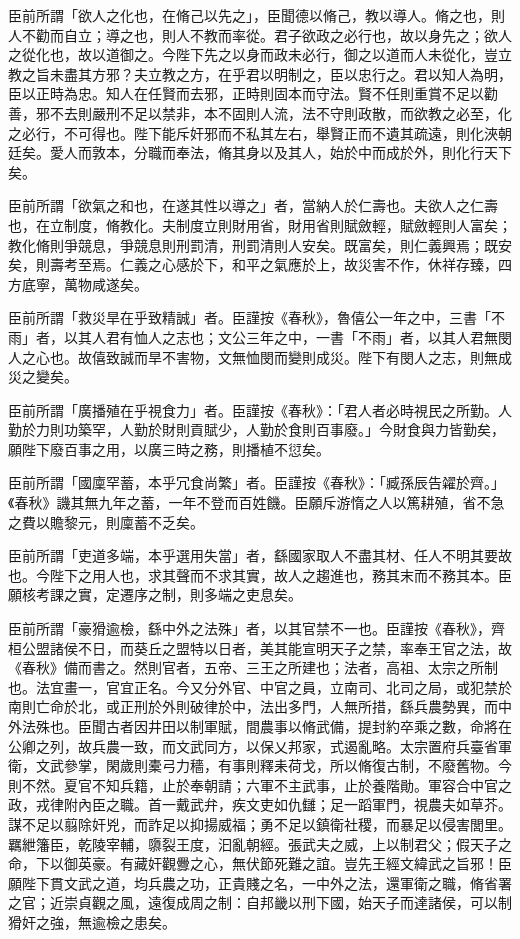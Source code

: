 \begin{pinyinscope}
 臣前所謂「欲人之化也，在脩己以先之」，臣聞德以脩己，教以導人。脩之也，則人不勸而自立；導之也，則人不教而率從。君子欲政之必行也，故以身先之；欲人之從化也，故以道御之。今陛下先之以身而政未必行，御之以道而人未從化，豈立教之旨未盡其方邪？夫立教之方，在乎君以明制之，臣以忠行之。君以知人為明，臣以正時為忠。知人在任賢而去邪，正時則固本而守法。賢不任則重賞不足以勸善，邪不去則嚴刑不足以禁非，本不固則人流，法不守則政散，而欲教之必至，化之必行，不可得也。陛下能斥奸邪而不私其左右，舉賢正而不遺其疏遠，則化浹朝廷矣。愛人而敦本，分職而奉法，脩其身以及其人，始於中而成於外，則化行天下矣。



 臣前所謂「欲氣之和也，在遂其性以導之」者，當納人於仁壽也。夫欲人之仁壽也，在立制度，脩教化。夫制度立則財用省，財用省則賦斂輕，賦斂輕則人富矣；教化脩則爭競息，爭競息則刑罰清，刑罰清則人安矣。既富矣，則仁義興焉；既安矣，則壽考至焉。仁義之心感於下，和平之氣應於上，故災害不作，休祥存臻，四方底寧，萬物咸遂矣。



 臣前所謂「救災旱在乎致精誠」者。臣謹按《春秋》，魯僖公一年之中，三書「不雨」者，以其人君有恤人之志也；文公三年之中，一書「不雨」者，以其人君無閔人之心也。故僖致誠而旱不害物，文無恤閔而變則成災。陛下有閔人之志，則無成災之變矣。



 臣前所謂「廣播殖在乎視食力」者。臣謹按《春秋》：「君人者必時視民之所勤。人勤於力則功築罕，人勤於財則貢賦少，人勤於食則百事廢。」今財食與力皆勤矣，願陛下廢百事之用，以廣三時之務，則播植不愆矣。



 臣前所謂「國廩罕蓄，本乎冗食尚繁」者。臣謹按《春秋》：「臧孫辰告糴於齊。」《春秋》譏其無九年之蓄，一年不登而百姓饑。臣願斥游惰之人以篤耕殖，省不急之費以贍黎元，則廩蓄不乏矣。



 臣前所謂「吏道多端，本乎選用失當」者，繇國家取人不盡其材、任人不明其要故也。今陛下之用人也，求其聲而不求其實，故人之趨進也，務其末而不務其本。臣願核考課之實，定遷序之制，則多端之吏息矣。



 臣前所謂「豪猾逾檢，繇中外之法殊」者，以其官禁不一也。臣謹按《春秋》，齊桓公盟諸侯不日，而葵丘之盟特以日者，美其能宣明天子之禁，率奉王官之法，故《春秋》備而書之。然則官者，五帝、三王之所建也；法者，高祖、太宗之所制也。法宜畫一，官宜正名。今又分外官、中官之員，立南司、北司之局，或犯禁於南則亡命於北，或正刑於外則破律於中，法出多門，人無所措，繇兵農勢異，而中外法殊也。臣聞古者因井田以制軍賦，間農事以脩武備，提封約卒乘之數，命將在公卿之列，故兵農一致，而文武同方，以保乂邦家，式遏亂略。太宗置府兵臺省軍衛，文武參掌，閑歲則橐弓力穡，有事則釋耒荷戈，所以脩復古制，不廢舊物。今則不然。夏官不知兵籍，止於奉朝請；六軍不主武事，止於養階勛。軍容合中官之政，戎律附內臣之職。首一戴武弁，疾文吏如仇讎；足一蹈軍門，視農夫如草芥。謀不足以翦除奸兇，而詐足以抑揚威福；勇不足以鎮衛社稷，而暴足以侵害閭里。羈紲籓臣，乾陵宰輔，隳裂王度，汩亂朝經。張武夫之威，上以制君父；假天子之命，下以御英豪。有藏奸觀釁之心，無伏節死難之誼。豈先王經文緯武之旨邪！臣願陛下貫文武之道，均兵農之功，正貴賤之名，一中外之法，還軍衛之職，脩省署之官；近崇貞觀之風，遠復成周之制：自邦畿以刑下國，始天子而達諸侯，可以制猾奸之強，無逾檢之患矣。




\end{pinyinscope}
